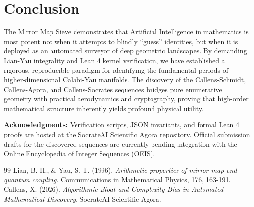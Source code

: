 \documentclass[12pt, reqno]{amsart}
\begin{document}
\section{Conclusion}
The Mirror Map Sieve demonstrates that Artificial Intelligence in mathematics is most potent not when it attempts to blindly ``guess'' identities, but when it is deployed as an automated surveyor of deep geometric landscapes. By demanding Lian-Yau integrality and Lean 4 kernel verification, we have established a rigorous, reproducible paradigm for identifying the fundamental periods of higher-dimensional Calabi-Yau manifolds. The discovery of the Callens-Schmidt, Callens-Agora, and Callens-Socrates sequences bridges pure enumerative geometry with practical aerodynamics and cryptography, proving that high-order mathematical structure inherently yields profound physical utility.

\vspace{1em}
\noindent \textbf{Acknowledgments:}
Verification scripts, JSON invariants, and formal Lean 4 proofs are hosted at the SocrateAI Scientific Agora repository. Official submission drafts for the discovered sequences are currently pending integration with the Online Encyclopedia of Integer Sequences (OEIS).


\begin{thebibliography}{99}
 Lian, B. H., \& Yau, S.-T. (1996). \textit{Arithmetic properties of mirror map and quantum coupling}. Communications in Mathematical Physics, 176, 163-191.
 Callens, X. (2026). \textit{Algorithmic Bloat and Complexity Bias in Automated Mathematical Discovery}. SocrateAI Scientific Agora.
\end{thebibliography}
\end{document}
